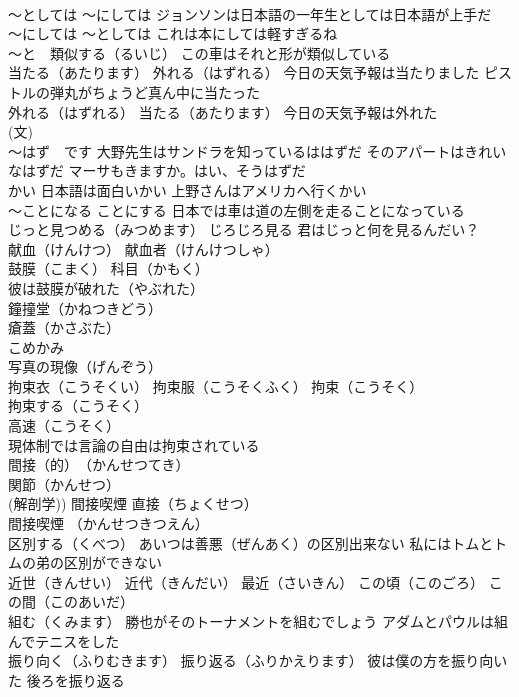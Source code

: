 \documentclass[8pt]{extreport}
\begin{document}
\begin{CJK}{UTF8}{min}
\\	～としては ～にしては ジョンソンは日本語の一年生としては日本語が上手だ
\\	～にしては ～としては これは本にしては軽すぎるね
\\	～と　類似する（るいじ） この車はそれと形が類似している
\\	当たる（あたります） 外れる（はずれる） 今日の天気予報は当たりました ピストルの弾丸がちょうど真ん中に当たった
\\	外れる（はずれる） 当たる（あたります） 今日の天気予報は外れた
\\	(文)　
\\	～はず　です 大野先生はサンドラを知っているははずだ そのアパートはきれいなはずだ マーサもきますか。はい、そうはずだ
\\	かい 日本語は面白いかい 上野さんはアメリカへ行くかい
\\	～ことになる ことにする 日本では車は道の左側を走ることになっている
\\	じっと見つめる（みつめます） じろじろ見る 君はじっと何を見るんだい？
\\	献血（けんけつ） 献血者（けんけつしゃ）
\\	鼓膜（こまく） 科目（かもく） 
\\	彼は鼓膜が破れた（やぶれた）
\\	鐘撞堂（かねつきどう）
\\	瘡蓋（かさぶた）
\\	こめかみ
\\	写真の現像（げんぞう）
\\	拘束衣（こうそくい） 拘束服（こうそくふく） 拘束（こうそく）
\\	拘束する（こうそく） 
\\	高速（こうそく） 
\\	現体制では言論の自由は拘束されている
\\	間接（的）　（かんせつてき） 
\\	関節（かんせつ）
\\	(解剖学)) 間接喫煙 直接（ちょくせつ）
\\	間接喫煙 （かんせつきつえん）
\\	区別する（くべつ） あいつは善悪（ぜんあく）の区別出来ない 私にはトムとトムの弟の区別ができない
\\	近世（きんせい） 近代（きんだい） 最近（さいきん） この頃（このごろ） この間（このあいだ）
\\	組む（くみます） 勝也がそのトーナメントを組むでしょう アダムとパウルは組んでテニスをした
\\	振り向く（ふりむきます） 振り返る（ふりかえります） 彼は僕の方を振り向いた 後ろを振り返る

\end{CJK}
\end{document}

